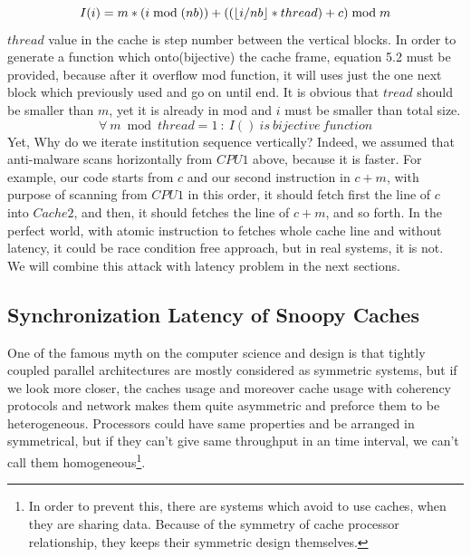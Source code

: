 \begin{equation}
	I(i)=m*(i\bmod{(nb)})+((\left \lfloor i/nb \right \rfloor*thread)+c)\bmod{m}\\ 
\end{equation}
$thread$ value in the cache is step number between the vertical blocks. In order to generate a function which onto(bijective) the cache frame, equation 5.2 must be provided, because after it overflow mod function, it will uses just the one next block which previously used and go on until end. It is obvious that $tread$ should be smaller than $m$, yet it is already in mod and $i$ must be smaller than total size. 
\begin{equation}
	\forall\: m\bmod thread = 1\ :\  I()\ is\ bijective\ function
\end{equation}
Yet, Why do we iterate institution sequence  vertically? Indeed, we assumed that anti-malware scans horizontally from $CPU1$ above, because it is faster. For example, our code starts from $c$ and our second instruction in $c+m$, with purpose of scanning from $CPU1$ in this order, it should  fetch first the line of $c$ into $Cache2$, and then, it should fetches the line of $c+m$, and so forth. In the perfect world, with atomic instruction to fetches whole cache line and without latency, it could be race condition free approach, but in real systems, it is not. We will combine this attack with latency problem in the next sections.
\subsection{Synchronization Latency of Snoopy Caches}
One of the famous myth on the computer science and design is that tightly coupled parallel architectures are mostly considered as symmetric systems, but if we look more closer, the caches usage and moreover cache usage with coherency protocols and network makes them quite asymmetric and preforce them to be heterogeneous. Processors could have same properties and be arranged in symmetrical, but if they can't give same throughput in an time interval, we can't call them homogeneous\footnote{In order to prevent this, there are systems which avoid to use caches, when they are sharing data. Because of the symmetry of cache processor relationship, they keeps their symmetric design themselves.}. 


